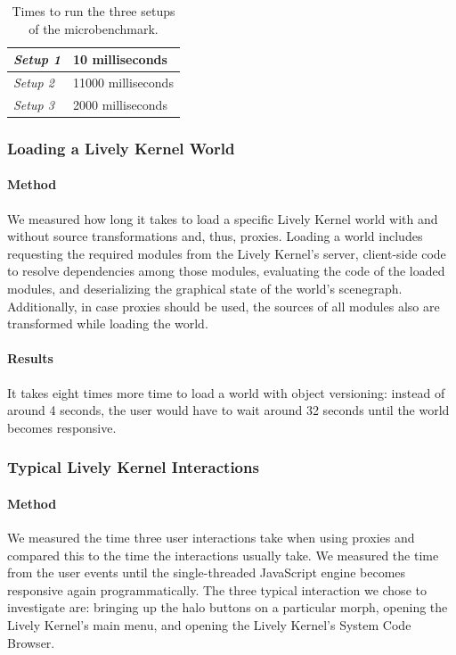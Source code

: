 \begin{table}[h]
\begin{center}
\begin{tabular}{| l | l |}
\hline
\emph{Setup 1} & 10 milliseconds \\ \hline
\emph{Setup 2} & 11000 milliseconds \\ \hline
\emph{Setup 3} & 2000 milliseconds \\ \hline
\end{tabular}
\end{center}
\caption[Table caption text]{Times to run the three setups of the microbenchmark.}
\label{table:microbenchmarkResults}
\end{table}


\subsubsection{Loading a Lively Kernel World}

\paragraph{Method}
We measured how long it takes to load a specific Lively Kernel world
with and without source transformations and, thus, proxies.  Loading a
world includes requesting the required modules from the Lively
Kernel's server, client-side code to resolve dependencies among those
modules, evaluating the code of the loaded modules, and deserializing
the graphical state of the world's scenegraph.  Additionally, in case
proxies should be used, the sources of all modules also are
transformed while loading the world.

\paragraph{Results}
It takes eight times more time to load a world with object versioning:
instead of around 4 seconds, the user would have to wait around 32
seconds until the world becomes responsive.


\subsubsection{Typical Lively Kernel Interactions}

\paragraph{Method}
We measured the time three user interactions take when using proxies
and compared this to the time the interactions usually take.  We
measured the time from the user events until the single-threaded
JavaScript engine becomes responsive again programmatically.  The
three typical interaction we chose to investigate are: bringing up the
halo buttons on a particular morph, opening the Lively Kernel's main
menu, and opening the Lively Kernel's System Code Browser.

